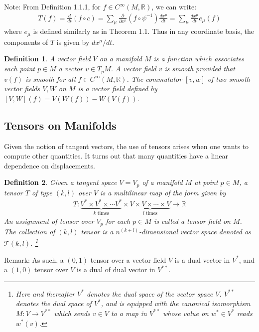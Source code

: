\documentclass[11pt, onesided]{book}
\theoremstyle{break}
\theoremstyle{break}
\newtheorem{defn}{Definition}[thm]
\newcommand{\R}{\mathbb{R}}
\newcommand{\pd}{\partial}
\newcommand{\note}{\color{red}Note: \color{black}}
\newcommand{\remark}{\color{blue}Remark: \color{black}}
\begin{document}
\note From Definition 1.1.1, for $f \in C^\infty(M, \R)$, we can write:
\begin{align*}
T(f) = \frac{d}{dt}(f\circ c) = \sum_{\mu}\frac{\pd}{\pd x^\mu}(f\circ \psi^{-1}) \frac{dx^\mu}{dt} = \sum_\mu \frac{dx^\mu}{dt}e_\mu(f)
\end{align*}
where $e_\mu$ is defined similarly as in Theorem 1.1. Thus in any coordinate basis, the components of $T$ is given by $dx^\mu / dt$.\\

\begin{defn}
A vector field $V$ on a manifold $M$ is a function which associates each point $p \in M$ a vector $v \in T_pM$. A vector field $v$ is smooth provided that $v(f)$ is smooth for all $f \in C^\infty(M, \R)$. The commutator $[v,w]$ of two smooth vector fields $V, W$ on $M$ is a vector field defined by $[V,W](f) = V(W(f)) - W(V(f))$. 
\end{defn}



\subsection{Tensors on Manifolds}
Given the notion of tangent vectors, the use of tensors arises when one wants to compute other quantities. It turns out that many quantities have a linear dependence on displacements. 

\begin{defn}
Given a tangent space $V= V_p$ of a manifold $M$ at point $p \in M$, a tensor $T$ of type $(k,l)$ over $V$ is a multilinear map of the form given by
\begin{align*}
T:\underbrace{V^*\times V^* \times \cdots V^*}_{k\text{ times}} \times \underbrace{V \times V \times \cdots \times V}_{l \text{ times}} \to \R
\end{align*}
An assignment of tensor over $V_p$ for each $p \in M$ is called a tensor field on $M$. The collection of $(k,l)$ tensor is a $n^{(k+l)}$-dimensional vector space denoted as $\mathcal{T}(k,l)$. 
\footnote{Here and thereafter $V^*$ denotes the dual space of the vector space $V$. $V^{**}$ denotes the dual space of $V^*$, and is equipped with the canonical isomorphism $M:V \to V^{**}$ which sends $v\in V$ to a map in $V^{**}$ whose value on $w^* \in V^*$ reads $w^*(v)$.}
\end{defn}

\remark As such, a $(0,1)$ tensor over a vector field $V$ is a dual vector in $V^*$, and a $(1,0)$ tensor over $V$ is a dual of dual vector in $V^{**}$.\\
\end{document}
